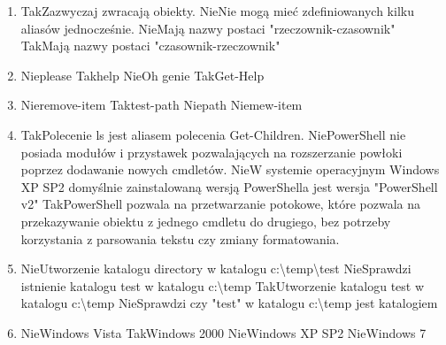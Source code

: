 \begin{enumerate}
		\newpage
		\item {}%
		{Tak}{Zazwyczaj zwracają obiekty.}%
		{Nie}{Nie mogą mieć zdefiniowanych kilku aliasów jednocześnie.}%
		{Nie}{Mają nazwy postaci "rzeczownik-czasownik"}%
		{Tak}{Mają nazwy postaci "czasownik-rzeczownik"}
		\item {}%
		{Nie}{please}%
		{Tak}{help}%
		{Nie}{Oh genie}%
		{Tak}{Get-Help}
		\item {}%
		{Nie}{remove-item}%
		{Tak}{test-path}%
		{Nie}{path}%
		{Nie}{mew-item}
		\item {}%
		{Tak}{Polecenie ls jest aliasem polecenia Get-Children.}%
		{Nie}{PowerShell nie posiada modułów i przystawek pozwalających na rozszerzanie powłoki poprzez dodawanie nowych cmdletów.}%
		{Nie}{W systemie operacyjnym Windows XP SP2 domyślnie zainstalowaną wersją PowerShella jest wersja "PowerShell v2"}%
		{Tak}{PowerShell pozwala na przetwarzanie potokowe, które pozwala na przekazywanie obiektu z jednego cmdletu do drugiego, bez potrzeby korzystania z parsowania tekstu czy zmiany formatowania.}
		\item {}%
		{Nie}{Utworzenie katalogu directory w katalogu c:\textbackslash temp\textbackslash test}%
		{Nie}{Sprawdzi istnienie katalogu test w katalogu c:\textbackslash temp}%
		{Tak}{Utworzenie katalogu test w katalogu c:\textbackslash temp}%
		{Nie}{Sprawdzi czy "test" w katalogu c:\textbackslash temp jest katalogiem}
		\item {}%
		{Nie}{Windows Vista}%
		{Tak}{Windows 2000}%
		{Nie}{Windows XP SP2}%
		{Nie}{Windows 7}
		

\end{enumerate}
